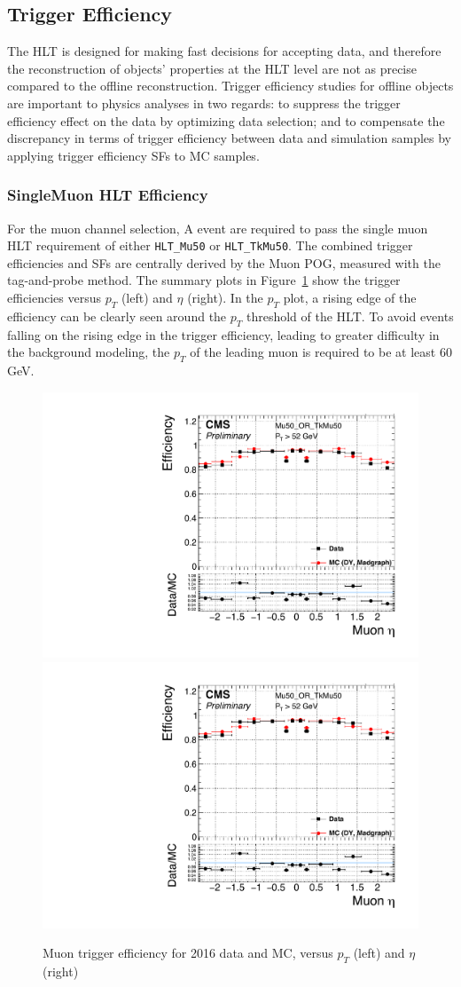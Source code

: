 \subsection{Trigger Efficiency}\label{sec:bkg_trig}
The HLT is designed for making fast decisions for accepting data, and therefore the reconstruction of objects' properties at the HLT level are not as precise compared to the offline reconstruction. Trigger efficiency studies for offline objects are important to physics analyses in two regards: to suppress the trigger efficiency effect on the data by optimizing data selection; and to compensate the discrepancy in terms of trigger efficiency between data and simulation samples by applying trigger efficiency SFs to MC samples.
\subsubsection{SingleMuon HLT Efficiency}
For the muon channel selection, A event are required to pass the single muon HLT requirement of either \texttt{HLT\_Mu50} or \texttt{HLT\_TkMu50}. The combined trigger efficiencies and SFs are centrally derived by the Muon POG, measured with the tag-and-probe method. The summary plots in Figure~\ref{fig:bg_trgeff_mu} show the trigger efficiencies versus $p_T$ (left) and $\eta$ (right). In the $p_T$ plot, a rising edge of the efficiency can be clearly seen around the $p_T$ threshold of the HLT. To avoid events falling on the rising edge in the trigger efficiency, leading to greater difficulty in the background modeling, the $p_T$ of the leading muon is required to be at least 60 GeV.

\begin{figure}[htpb]
\begin{center}
\includegraphics[width=0.49\linewidth, page=2]{figures/bg_muontrgeff.pdf}
\includegraphics[width=0.49\linewidth, page=1]{figures/bg_muontrgeff.pdf}
\caption{Muon trigger efficiency for 2016 data and MC, versus $p_T$ (left) and $\eta$ (right)}
\label{fig:bg_trgeff_mu}
\end{center}
\end{figure}

